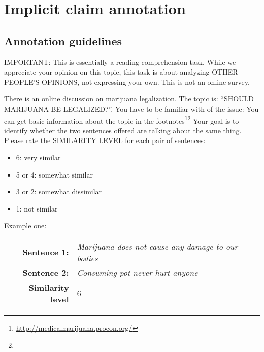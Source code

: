 \section{Implicit claim annotation}
\label{app:sec:argpremises_annotation}

\subsection*{Annotation guidelines}


IMPORTANT: This is essentially a reading comprehension task. While we
appreciate your opinion on this topic, this task is about analyzing OTHER
PEOPLE'S OPINIONS, not expressing your own. This is not an online survey.

\noindent There is an online discussion on marijuana legalization. The topic is: ``SHOULD
MARIJUANA BE LEGALIZED?''. You have to be familiar with of the issue: You can
get basic information about the topic 
in the footnotes\footnote{\url{http://medicalmarijuana.procon.org/}}\footnote{
}
Your goal is to identify whether the two sentences offered are talking about
the same thing. Please rate the SIMILARITY LEVEL for each pair of sentences:
\begin{itemize}
\item 6: very similar
\item 5 or 4: somewhat similar
\item 3 or 2: somewhat dissimilar
\item 1: not similar
\end{itemize}

\noindent Example one:
\begin{table}[h!]
\begin{tabular}{|@{\ }r@{\ \  }p{}|}
\hline
\textbf{Sentence 1:} & \emph{Marijuana does not cause any damage to our bodies}\\
\textbf{Sentence 2:} & \emph{Consuming pot never hurt anyone}\\
\textbf{Similarity level} & 6 \\
\hline
\end{tabular}
\end{table}
\pagebreak

